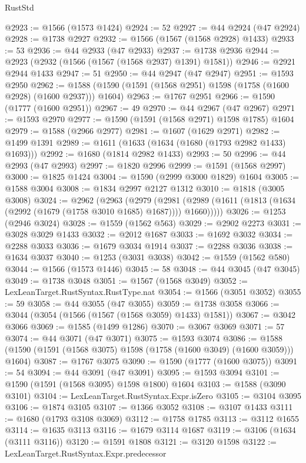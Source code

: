 \begin{lexlean}{RustStd}
\begin{coremodule}
@2923 := @1566 (@1573 @1424)
@2924 := 52
@2927 := @44 @2924 (@47 @2924)
@2928 := @1738 @2927
@2932 := @1566 (@1567 (@1568 @2928) @1433)
@2933 := 53
@2936 := @44 @2933 (@47 @2933)
@2937 := @1738 @2936
@2944 := @2923 (@2932 (@1566 (@1567 (@1568 @2937) @1391) @1581))
@2946 := @2921 @2944 @1433
@2947 := 51
@2950 := @44 @2947 (@47 @2947)
@2951 := @1593 @2950
@2962 := @1588 (@1590 (@1591 (@1568 @2951) @1598 (@1758 (@1600 @2928) (@1600 @2937))) @1604)
@2963 := @1767 @2951
@2966 := @1590 (@1777 (@1600 @2951))
@2967 := 49
@2970 := @44 @2967 (@47 @2967)
@2971 := @1593 @2970
@2977 := @1590 (@1591 (@1568 @2971) @1598 @1785) @1604
@2979 := @1588 (@2966 @2977)
@2981 := @1607 (@1629 @2971)
@2982 := @1499 @1391
@2989 := @1611 (@1633 (@1634 (@1680 (@1793 @2982 @1433) @1693)))
@2992 := @1680 (@1814 @2982 @1433)
@2993 := 50
@2996 := @44 @2993 (@47 @2993)
@2997 := @1820 @2996
@2999 := @1591 (@1568 @2997)
@3000 := @1825 @1424
@3004 := @1590 (@2999 @3000 @1829) @1604
@3005 := @1588 @3004
@3008 := @1834 @2997 @2127 @1312
@3010 := @1818 (@3005 @3008)
@3024 := @2962
    (@2963
      (@2979
        (@2981 (@2989 (@1611 (@1813 (@1634 (@2992 (@1679 (@1758 @3010 @1685) @1687)))) @1660)))))
@3026 := @1253 (@2946 @3024)
@3028 := @1559 (@1562 @563)
@3029 := @2902 @2273
@3031 := @3028 @3029 @1433
@3032 := @2012 @1687
@3033 := @1692 @3032
@3034 := @2288 @3033
@3036 := @1679 @3034 @1914
@3037 := @2288 @3036
@3038 := @1634 @3037
@3040 := @1253 (@3031 @3038)
@3042 := @1559 (@1562 @580)
@3044 := @1566 (@1573 @1446)
@3045 := 58
@3048 := @44 @3045 (@47 @3045)
@3049 := @1738 @3048
@3051 := @1567 (@1568 @3049)
@3052 := LexLeanTarget.RustSyntax.RustType.nat
@3054 := @1566 (@3051 @3052)
@3055 := 59
@3058 := @44 @3055 (@47 @3055)
@3059 := @1738 @3058
@3066 := @3044 (@3054 (@1566 (@1567 (@1568 @3059) @1433) @1581))
@3067 := @3042 @3066
@3069 := @1585 (@1499 @1286)
@3070 := @3067 @3069
@3071 := 57
@3074 := @44 @3071 (@47 @3071)
@3075 := @1593 @3074
@3086 := @1588 (@1590 (@1591 (@1568 @3075) @1598 (@1758 (@1600 @3049) (@1600 @3059))) @1604)
@3087 := @1767 @3075
@3090 := @1590 (@1777 (@1600 @3075))
@3091 := 54
@3094 := @44 @3091 (@47 @3091)
@3095 := @1593 @3094
@3101 := @1590 (@1591 (@1568 @3095) @1598 @1800) @1604
@3103 := @1588 (@3090 @3101)
@3104 := LexLeanTarget.RustSyntax.Expr.isZero
@3105 := @3104 @3095
@3106 := @1874 @3105
@3107 := @1366 @3052
@3108 := @3107 @1433
@3111 := @1680 (@1793 @3108 @3069)
@3112 := @1758 @1785
@3113 := @3112 @1655
@3114 := @1635 @3113
@3116 := @1679 @3114 @1687
@3119 := @3106 (@1634 (@3111 @3116))
@3120 := @1591 @1808
@3121 := @3120 @1598
@3122 := LexLeanTarget.RustSyntax.Expr.predecessor

\end{coremodule}
\end{lexlean}
